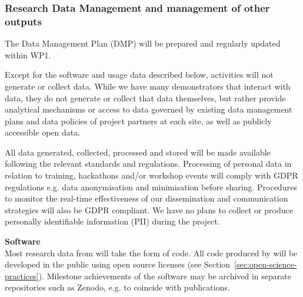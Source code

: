 

\TOWRITE{}{}

\subsubsection{Research Data Management and management of other outputs}

The Data Management Plan (DMP) will be prepared and regularly updated within WP1.

Except for the software and usage data described below,
\TheProject activities will not generate or collect data.
While we have many demonstrators that interact with data, they do not generate or collect that
data themselves, but rather provide analytical mechanisms or access to data governed by
existing data management plans and data policies of project partners at each site,
as well as publicly accessible open data.

All data generated, collected, processed and stored will be made available following the
relevant standards and regulations. Processing of personal data in relation to training,
hackathons and/or workshop events will comply with GDPR regulations e.g. data
anonymisation and minimisation before sharing.
Procedures to monitor the real-time effectiveness of our dissemination and
communication strategies will also be GDPR compliant.
We have no plans to collect or produce personally identifiable information (PII)
during the project.

\noindent \textbf{Software} \\
Most research data from \TheProject will take the form of code.
All code produced by \TheProject will be developed in the public using open
source licenses (see Section~\ref{sec:open-science-practices}).
Milestone achievements of the software may be archived
in separate repositories such as Zenodo,
e.g. to coincide with publications.

